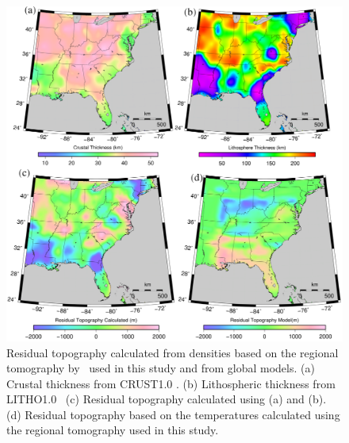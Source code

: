 \documentclass[draft,linenumbers]{agujournal2018}
\begin{document}
%   

\begin{figure}[h!]
    \centering
    \includegraphics[width=\linewidth]{figures/topography.png}
    \caption{Residual topography calculated from densities based on the regional tomography by~\citet{Biryol_2016} used in this study and from global models. (a) Crustal thickness from CRUST1.0 \citep{laske2013update}. (b) Lithospheric thickness from LITHO1.0~\citep{pasyanos2014litho1} (c) Residual topography calculated using (a) and (b). (d) Residual topography based on the temperatures calculated using the regional tomography used in this study. }
    \label{topo_res}
\end{figure}
\end{document}
